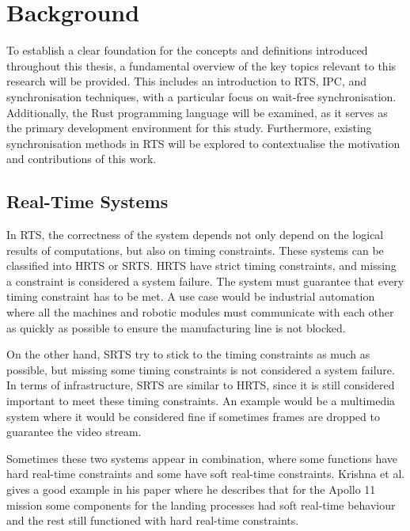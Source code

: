 \chapter{Background}\label{ch:background}

To establish a clear foundation for the concepts and definitions introduced throughout this thesis, a fundamental overview of the key topics relevant to this research will be provided. This includes an introduction to \ac{RTS}, \acf{IPC}, and synchronisation techniques, with a particular focus on wait-free synchronisation. Additionally, the Rust programming language will be examined, as it serves as the primary development environment for this study. Furthermore, existing synchronisation methods in \ac{RTS} will be explored to contextualise the motivation and contributions of this work.

\section{Real-Time Systems}\label{sec:real-time}

In \ac{RTS}, the correctness of the system depends not only depend on the logical results of computations, but also on timing constraints. These systems can be classified into \ac{HRTS} or \ac{SRTS}. \ac{HRTS} have strict timing constraints, and missing a constraint is considered a system failure. The system must guarantee that every timing constraint has to be met. A use case would be industrial automation where all the machines and robotic modules must communicate with each other as quickly as possible to ensure the manufacturing line is not blocked. \cite{HardSoftRealTime}

On the other hand, \ac{SRTS} try to stick to the timing constraints as much as possible, but missing some timing constraints is not considered a system failure. In terms of infrastructure, \ac{SRTS} are similar to \ac{HRTS}, since it is still considered important to meet these timing constraints. An example would be a multimedia system where it would be considered fine if sometimes frames are dropped to guarantee the video stream. \cite{HardSoftRealTime}

Sometimes these two systems appear in combination, where some functions have hard real-time constraints and some have soft real-time constraints. Krishna et al. gives a good example in his paper where he describes that for the Apollo 11 mission some components for the landing processes had soft real-time behaviour and the rest still functioned with hard real-time constraints. \cite{HardSoftRealTime}

